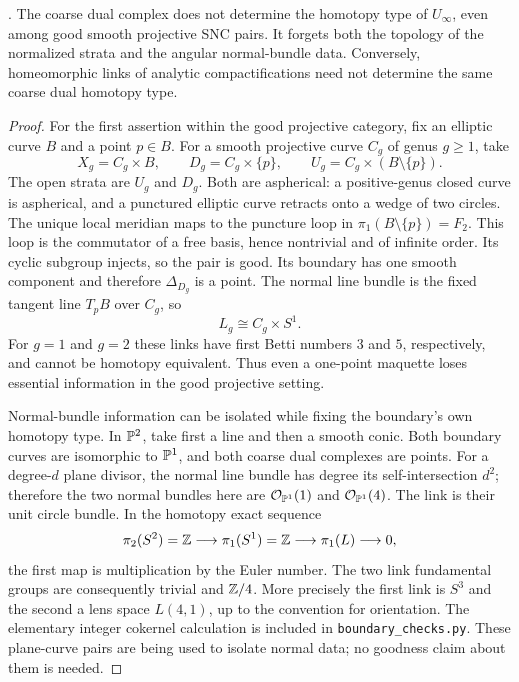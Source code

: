 \begin{proposition}
\label{P4e}
. The coarse dual complex does not determine the homotopy type of $U_\infty$, even among good smooth projective SNC pairs. It forgets both the topology of the normalized strata and the angular normal-bundle data. Conversely, homeomorphic links of analytic compactifications need not determine the same coarse dual homotopy type.
\end{proposition}
\begin{proof}
For the first assertion within the good projective category, fix an elliptic curve $B$ and a point $p\in B$. For a smooth projective curve $C_g$ of genus $g\ge1$, take
\[
 X_g=C_g\times B,\qquad D_g=C_g\times\{p\},
 \qquad U_g=C_g\times(B\setminus\{p\}).
\]
The open strata are $U_g$ and $D_g$. Both are aspherical: a positive-genus closed curve is aspherical, and a punctured elliptic curve retracts onto a wedge of two circles. The unique local meridian maps to the puncture loop in
$\pi_1(B\setminus\{p\})=F_2$. This loop is the commutator of a free basis, hence nontrivial and of infinite order. Its cyclic subgroup injects, so the pair is good. Its boundary has one smooth component and therefore $\Delta_{D_g}$ is a point. The normal line bundle is the fixed tangent line $T_pB$ over $C_g$, so
\[
 L_g\cong C_g\times S^1.
\]
For $g=1$ and $g=2$ these links have first Betti numbers $3$ and $5$, respectively, and cannot be homotopy equivalent. Thus even a one-point maquette loses essential information in the good projective setting.

Normal-bundle information can be isolated while fixing the boundary's own homotopy type. In $\mathbb P^2$, take first a line and then a smooth conic. Both boundary curves are isomorphic to $\mathbb P^1$, and both coarse dual complexes are points. For a degree-$d$ plane divisor, the normal line bundle has degree its self-intersection $d^2$; therefore the two normal bundles here are $\mathcal O_{\mathbb P^1}(1)$ and $\mathcal O_{\mathbb P^1}(4)$. The link is their unit circle bundle. In the homotopy exact sequence
\[
 \pi_2(S^2)=\mathbb Z\longrightarrow\pi_1(S^1)=\mathbb Z
 \longrightarrow\pi_1(L)\longrightarrow0,
\]
the first map is multiplication by the Euler number. The two link fundamental groups are consequently trivial and $\mathbb Z/4$. More precisely the first link is $S^3$ and the second a lens space $L(4,1)$, up to the convention for orientation. The elementary integer cokernel calculation is included in \texttt{boundary\_checks.py}. These plane-curve pairs are being used to isolate normal data; no goodness claim about them is needed.


\end{proof}
